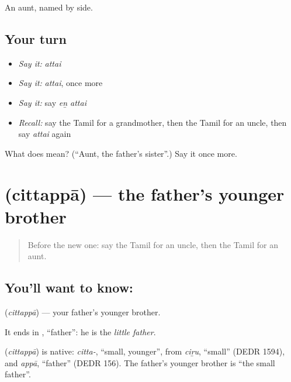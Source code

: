 \begin{grammarlens}[title={What you've built}]
An aunt, named by side.
\end{grammarlens}

\subsection*{Your turn}
\begin{itemize}
\raggedright
  \item \emph{Say it:} \emph{attai}
  \item \emph{Say it:} \emph{attai}, once more
  \item \emph{Say it:} say \emph{eṉ attai}
  \item \emph{Recall:} say the Tamil for a grandmother, then the Tamil for an uncle, then say \emph{attai} again
\end{itemize}

\begin{tcolorbox}[breakable,colback=teal!4,colframe=teal!35!black,title={Before you move on}]
What does  mean? (\textquotedblleft{}Aunt, the father's sister\textquotedblright{}.) Say it once more.
\end{tcolorbox}
\section[\texorpdfstring{\ta{சித்தப்பா} (cittappā)}{சித்தப்பா (cittappā)}]{ (cittappā) — the father's younger brother}

\label{lesson:TA-C101-fathersyoungerbrother}



\begin{quote}
Before the new one: say the Tamil for an uncle, then the Tamil for an aunt.
\end{quote}

\subsection*{You'll want to know: }
\textbf{} (\emph{cittappā}) — your father's younger brother.

It ends in \textbf{}, \textquotedblleft{}father\textquotedblright{}: he is the \emph{little father}.

\begin{cousinweb}
\textbf{} (\emph{cittappā}) is native: \emph{citta-}, \textquotedblleft{}small, younger\textquotedblright{}, from \emph{ciṟu}, \textquotedblleft{}small\textquotedblright{} (DEDR 1594), and \emph{appā}, \textquotedblleft{}father\textquotedblright{} (DEDR 156). The father's younger brother is \textquotedblleft{}the small father\textquotedblright{}.
\end{cousinweb}

